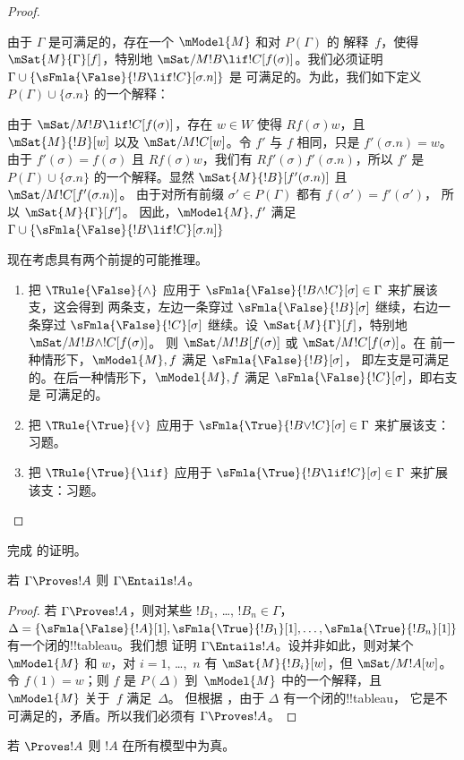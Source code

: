 \documentclass[../../../include/open-logic-section]{subfiles}
\begin{document}
\begin{proof}
\begin{enumerate}
  由于 $\Gamma$ 是可满足的，存在一个 $\mModel{M}$ 和对 $P(\Gamma)$ 的
  解释~$f$，使得 $\mSat{M}{\Gamma}[f]$，特别地
  $\mSat/{M}{!B \lif !C}[f(\sigma)]$。我们必须证明
  $\Gamma \cup \{\sFmla{\False}{!B \lif !C}[\sigma.n]\}$ 是
  可满足的。为此，我们如下定义 $P(\Gamma)
  \cup \{\sigma.n\}$ 的一个解释：

  由于 $\mSat/{M}{!B \lif !C}[f(\sigma)]$，存在 $w \in W$ 使得
  $Rf(\sigma)w$，且 $\mSat{M}{!B}[w]$ 以及
  $\mSat/{M}{!C}[w]$。令 $f'$ 与 $f$ 相同，只是 $f'(\sigma.n)
  = w$。由于 $f'(\sigma) = f(\sigma)$ 且 $Rf(\sigma)w$，我们有
  $Rf'(\sigma)f'(\sigma.n)$，所以 $f'$ 是
  $P(\Gamma) \cup \{\sigma.n\}$ 的一个解释。显然
  $\mSat{M}{!B}[f'(\sigma.n)]$ 且 $\mSat/{M}{!C}[f'(\sigma.n)]$。
  由于对所有前缀 $\sigma' \in P(\Gamma)$ 都有 $f(\sigma') = f'(\sigma')$，
  所以 $\mSat{M}{\Gamma}[f']$。 因此，$\mModel{M}, f'$ 满足
  $\Gamma \cup \{\sFmla{\False}{!B \lif !C}[\sigma.n]\}$
\end{enumerate}
现在考虑具有两个前提的可能推理。
\begin{enumerate}
\item 把 $\TRule{\False}{\land}$ 应用于
  $\sFmla{\False}{!B \land !C}[\sigma] \in \Gamma$ 来扩展该支，这会得到
  两条支，左边一条穿过
  $\sFmla{\False}{!B}[\sigma]$ 继续，右边一条穿过
  $\sFmla{\False}{!C}[\sigma]$ 继续。设 $\mSat{M}{\Gamma}[f]$，特别地
  $\mSat/{M}{!B \land !C}[f(\sigma)]$。 则
  $\mSat/{M}{!B}[f(\sigma)]$ 或 $\mSat/{M}{!C}[f(\sigma)]$。在
  前一种情形下，$\mModel{M}, f$ 满足 $\sFmla{\False}{!B}[\sigma]$，
  即左支是可满足的。在后一种情形下，$\mModel{M}, f$
  满足 $\sFmla{\False}{!C}[\sigma]$，即右支是
  可满足的。
\item 把 $\TRule{\True}{\lor}$ 应用于
    $\sFmla{\True}{!B \lor !C}[\sigma] \in \Gamma$ 来扩展该支：习题。
\item 把 $\TRule{\True}{\lif}$ 应用于
    $\sFmla{\True}{!B \lif !C}[\sigma] \in \Gamma$ 来扩展该支：习题。
\end{enumerate}
\end{proof}

\begin{prob}
完成  的证明。
\end{prob}

\begin{cor}
若 $\Gamma \Proves !A$ 则 $\Gamma \Entails !A$。
\end{cor}

\begin{proof}
  若 $\Gamma \Proves !A$，则对某些 $!B_1$, \dots, $!B_n \in
  \Gamma$，$\Delta = \{\sFmla{\False}{!A}[1], \sFmla{\True}{!B_1}[1],
  \dots, \sFmla{\True}{!B_n}[1]\}$ 有一个闭的!!{tableau}。我们想
  证明 $\Gamma \Entails !A$。设并非如此，则对某个
  $\mModel{M}$ 和 $w$，对 $i=1$, \dots,~$n$ 有 $\mSat{M}{!B_i}[w]$，但
  $\mSat/{M}{!A}[w]$。令 $f(1) = w$；则 $f$ 是
  $P(\Delta)$ 到~$\mModel{M}$ 中的一个解释，且 $\mModel{M}$ 关于~$f$ 满足~$\Delta$。
  但根据 ，由于 $\Delta$ 有一个闭的!!{tableau}，
  它是不可满足的，矛盾。所以我们必须有 $\Gamma \Proves !A$。
\end{proof}

\begin{cor}
若 $\Proves !A$ 则 $!A$ 在所有模型中为真。
\end{cor}
\end{document}
